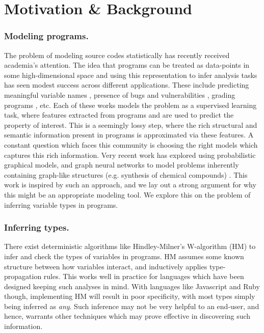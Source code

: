 \section{Motivation \& Background}
\label{sec:motivation}

\subsubsection{Modeling programs.} The problem of modeling source codes statistically has recently received academia's attention. The idea that programs can be treated as data-points in some high-dimensional space and using this representation to infer analysis tasks has seen modest success across different applications. These include predicting meaningful variable names \cite{}, presence of bugs and vulnerabilities \cite{}, grading programs \cite{}, etc. Each of these works models the problem as a supervised learning task, where features extracted from programs and are used to predict the property of interest. This is a seemingly lossy step, where the rich structural and semantic information present in programs is approximated via these features. A constant question which faces this community is choosing the right models which captures this rich information. Very recent work has explored using probabilistic graphical models, and graph neural networks to model problems inherently containing graph-like structures (e.g. synthesis of chemical compounds) \cite{}. This work is inspired by such an approach, and we lay out a strong argument for why this might be an appropriate modeling tool. We explore this on the problem of inferring variable types in programs.

\subsubsection{Inferring types.}
There exist deterministic algorithms like Hindley-Milner's W-algorithm (HM) to infer and check the types of variables in programs. HM assumes some known structure between how variables interact, and inductively applies type-propagation rules. This works well in practice for languages which have been designed keeping such analyses in mind. With languages like Javascript and Ruby though, implementing HM will result in poor specificity, with most types simply being inferred as \textit{any}. Such inference may not be very helpful to an end-user, and hence, warrants other techniques which may prove effective in discovering such information. 


